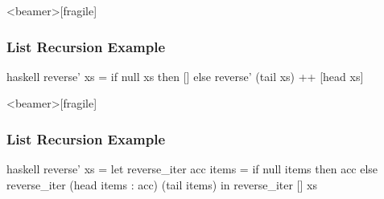 \documentclass[dvipsnames]{beamer}
\theoremstyle{plain}
\begin{document}
\begin{frame}<beamer>[fragile]
  \frametitle{List Recursion Example}

  \begin{example}
    \begin{pygments}{haskell}
reverse' xs =
    if null xs
    then []
    else reverse' (tail xs) ++ [head xs]
    \end{pygments}
  \end{example}
\end{frame}

\begin{frame}<beamer>[fragile]
  \frametitle{List Recursion Example}

  \begin{example}
    \begin{pygments}{haskell}
reverse' xs =
    let
        reverse_iter acc items =
            if null items
            then acc
            else reverse_iter (head items : acc) (tail items)
    in
        reverse_iter [] xs
    \end{pygments}
  \end{example}
\end{frame}
% 
% 
% 
\end{document}
